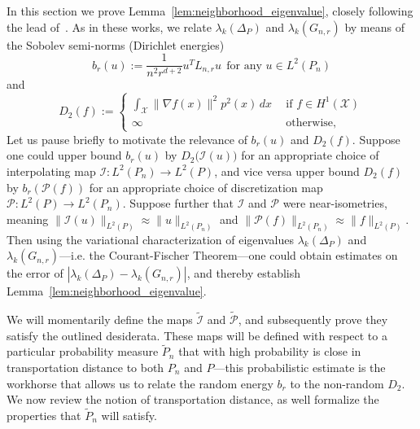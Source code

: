 \documentclass[twoside]{article}
\newcommand{\1}{\mathbf{1}}
\newcommand{\Lap}{L}
\newcommand{\Xset}{\mathcal{X}}
\newcommand{\Leb}{L}
\newcommand{\mc}[1]{\mathcal{#1}}
\newcommand{\wt}[1]{\widetilde{#1}}
\theoremstyle{definition}
\theoremstyle{remark}
\begin{document}
In this section we prove Lemma~\ref{lem:neighborhood_eigenvalue}, closely following the lead of~\citep{burago2014,trillos2019,calder2019}. As in these works, we relate $\lambda_k(\Delta_P)$ and $\lambda_k(G_{n,r})$ by means of the Sobolev semi-norms (Dirichlet energies)
\begin{equation*}
b_r(u) := \frac{1}{n^2 r^{d+ 2}}u^T \Lap_{n,r} u~~\textrm{for any $u \in \Leb^2(P_n)$}
\end{equation*}
and
\begin{equation*}
D_2(f) :=
\begin{cases*}
\int_{\Xset} \|\nabla f(x)\|^2 p^2(x) \,dx~~ &\textrm{if $f \in H^1(\Xset)$} \\
\infty~~ & \textrm{otherwise,}
\end{cases*}
\end{equation*}
Let us pause briefly to motivate the relevance of $b_r(u)$ and $D_2(f)$. Suppose one could upper bound $b_r(u)$ by $D_2\bigl(\mc{I}(u)\bigr)$ for an appropriate choice of interpolating map $\mc{I}: \Leb^2(P_n) \to \Leb^2(P)$, and vice versa upper bound $D_2(f)$ by $b_r(\mc{P}(f))$ for an appropriate choice of discretization map $\mc{P}: \Leb^2(P) \to \Leb^2(P_n)$. Suppose further that $\mc{I}$ and $\mc{P}$ were near-isometries, meaning $\|\mc{I}(u)\|_{\Leb^2(P)} \approx \|u\|_{\Leb^2(P_n)}$ and $\|\mc{P}(f)\|_{\Leb^2(P_n)} \approx \|f\|_{\Leb^2(P)}$. Then using the variational characterization of eigenvalues $\lambda_k(\Delta_P)$ and $\lambda_k(G_{n,r})$---i.e. the Courant-Fischer Theorem---one could obtain estimates on the error of $|\lambda_k(\Delta_P) - \lambda_k(G_{n,r})|$, and thereby establish Lemma~\ref{lem:neighborhood_eigenvalue}.

We will momentarily define the maps $\wt{\mc{I}}$ and $\wt{\mc{P}}$, and subsequently prove they satisfy the outlined desiderata. These maps will be defined with respect to a particular probability measure $\wt{P}_n$ that with high probability is close in transportation distance to both $P_n$ and $P$---this probabilistic estimate is the workhorse that allows us to relate the random energy $b_r$ to the non-random $D_2$.  We now review the notion of transportation distance, as well formalize the properties that $\wt{P}_n$ will satisfy.
\end{document}
